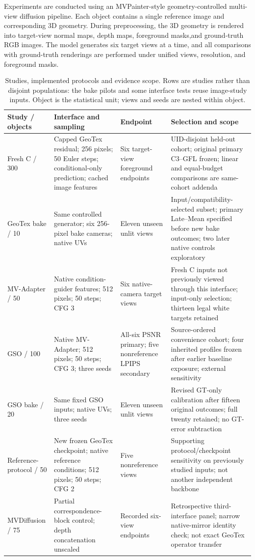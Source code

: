 \documentclass[times,twocolumn,final]{elsarticle}
\providecommand{\DIFdel}[1]{{\protect\color{red} \scriptsize #1}} %
\providecommand{\DIFaddbegin}{} %
\providecommand{\DIFaddend}{} %
\providecommand{\DIFdelbegin}{} %
\providecommand{\DIFdelend}{} %
\begin{document}
\DIFdelbegin \DIFdel{Experiments are conducted using an MVPainter-style geometry-controlled multi-view diffusion pipeline. Each object contains a single reference image and corresponding 3D geometry. During preprocessing, the 3D geometry is rendered into target-view normal maps, depth maps, foreground masks,and ground-truth RGB images. The model generates six target views at a time, and all comparisons with ground-truth renderings are performed under unified views, resolution, and foreground masks. }\DIFdelend \DIFaddbegin \begin{table}[t]
\centering\scriptsize\setlength{\tabcolsep}{3pt}
\caption{Studies, implemented protocols and evidence scope. Rows are studies rather than disjoint populations: the bake pilots and some interface tests reuse image-study inputs. Object is the statistical unit; views and seeds are nested within object.}
\label{tab:study-design}
\begin{tabular}{p{}p{}p{}p{}}
\toprule Study / objects & Interface and sampling & Endpoint & Selection and scope \\
\midrule
Fresh C / 300 & Capped GeoTex residual; 256 pixels; 50 Euler steps; conditional-only prediction; cached image features & Six target-view foreground endpoints & UID-disjoint held-out cohort; original primary C3--GFL frozen; linear and equal-budget comparisons are same-cohort addenda \\
GeoTex bake / 10 & Same controlled generator; six 256-pixel bake cameras; native UVs & Eleven unseen unlit views & Input/compatibility-selected subset; primary Late--Mean specified before new bake outcomes; two later native controls exploratory \\
MV-Adapter / 50 & Native condition-guider features; 512 pixels; 50 steps; CFG 3 & Six native-camera target views & Fresh C inputs not previously viewed through this interface; input-only selection; thirteen legal white targets retained \\
GSO / 100 & Native MV-Adapter; 512 pixels; 50 steps; CFG 3; three seeds & All-six PSNR primary; five nonreference LPIPS secondary & Source-ordered convenience cohort; four inherited profiles frozen after earlier baseline exposure; external sensitivity \\
GSO bake / 20 & Same fixed GSO inputs; native UVs; three seeds & Eleven unseen unlit views & Revised GT-only calibration after fifteen original outcomes; full twenty retained; no GT-error subtraction \\
Reference-protocol / 50 & New frozen GeoTex checkpoint; native reference conditions; 512 pixels; 50 steps; CFG 2 & Five nonreference views & Supporting protocol/checkpoint sensitivity on previously studied inputs; not another independent backbone \\
MVDiffusion / 75 & Partial correspondence-block control; depth concatenation unscaled & Recorded six-view endpoints & Retrospective third-interface panel; narrow native-mirror identity check; not exact GeoTex operator transfer \\
\bottomrule
\end{tabular}
\end{table}
\DIFaddend 
\end{document}
